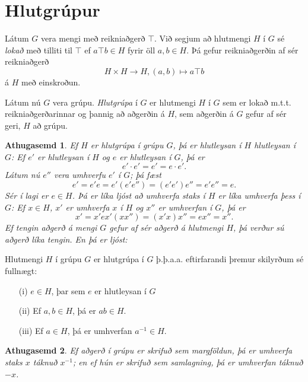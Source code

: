 \documentclass[a4paper,icelandic,11pt]{book}
\theoremstyle{plain}
\newtheorem*{ath}{Athugasemd}
\begin{document}
\section{Hlutgrúpur}
\begin{skilgr}
  Látum $G$ vera mengi með reikniaðgerð $\top$. Við segjum að hlutmengi $H$ í
  $G$ sé \emph{lokað}
  með tilliti til $\top$ ef $a\top b\in H$ fyrir öll $a,b \in H$.
  Þá gefur reikniaðgerðin af sér reikniaðgerð
  \[ H\times H \to H, (a,b) \mapsto a\top b \]
  á $H$ með einskroðun.
\end{skilgr}
\begin{skilgr}
  Látum nú $G$ vera grúpu.
  \emph{Hlutgrúpa}
  í $G$ er hlutmengi $H$ í $G$ sem
  er lokað m.t.t. reikniaðgerðarinnar og þannig að aðgerðin á $H$, sem aðgerðin
  á $G$ gefur af sér geri, $H$ að grúpu.
\end{skilgr}
\begin{ath}
  Ef $H$ er hlutgrúpa í grúpu $G$, þá er hlutleysan í $H$ hlutleysan í $G$: Ef
  $e'$ er hlutleysan í $H$ og $e$ er hlutleysan í $G$, þá er
  \[e'\cdot e' = e' =e\cdot e' .\]
  Látum nú $e''$ vera umhverfu $e'$ í $G$; þá fæst
  \[ e' = e'e = e'(e'e'') = (e'e')e'' = e'e'' = e. \]
  Sér í lagi er $e\in H$. Þá er líka ljóst að umhverfa staks í $H$ er líka
  umhverfa þess í $G$: Ef $x\in H$, $x'$ er umhverfa $x$ í $H$ og $x''$ er
  umhverfan í $G$, þá er
  \[ x' = x'e  x'(xx'') = (x'x) x''= ex'' = x'' .\]
  Ef tengin aðgerð á mengi $G$ gefur af sér aðgerð á hlutmengi $H$, þá verður
  sú aðgerð líka tengin. En þá er ljóst:
\end{ath}
\begin{setn}
  Hlutmengi $H$ í grúpu $G$ er hlutgrúpa í $G$ þ.þ.a.a. eftirfarandi þremur
  skilyrðum sé fullnægt:
  \begin{itemize}
    \item [(i)] $e\in H$, þar sem $e$ er hlutleysan í $G$
    \item [(ii)] Ef $a,b\in H$, þá er $ab\in H$.
    \item [(iii)] Ef $a\in H$, þá er umhverfan $a^{-1}\in H$.
  \end{itemize}
\end{setn}
\begin{ath}
  Ef aðgerð í grúpu er skrifuð sem margföldun, þá er umhverfa staks $x$ táknuð
  $x^{-1}$; en ef hún er skrifuð sem samlagning, þá er umhverfan táknuð $-x$.
\end{ath}
\end{document}
